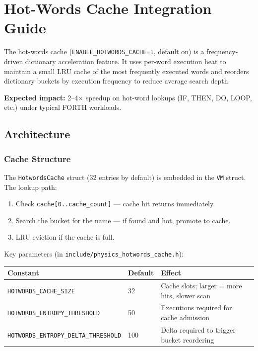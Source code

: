 
\section{Hot-Words Cache Integration Guide}

The hot-words cache (\texttt{ENABLE\_HOTWORDS\_CACHE=1}, default on) is a
frequency-driven dictionary acceleration feature. It uses per-word execution
heat to maintain a small LRU cache of the most frequently executed words and
reorders dictionary buckets by execution frequency to reduce average search
depth.

\textbf{Expected impact:} 2--4$\times$ speedup on hot-word lookups (IF, THEN,
DO, LOOP, etc.) under typical FORTH workloads.

\subsection{Architecture}

\subsubsection{Cache Structure}

The \texttt{HotwordsCache} struct (32 entries by default) is embedded in the
\texttt{VM} struct. The lookup path:

\begin{enumerate}
  \item Check \texttt{cache[0..cache\_count]} — cache hit returns immediately.
  \item Search the bucket for the name — if found and hot, promote to cache.
  \item LRU eviction if the cache is full.
\end{enumerate}

Key parameters (in \texttt{include/physics\_hotwords\_cache.h}):

\begin{center}
\begin{tabular}{lll}
\toprule
Constant & Default & Effect \\
\midrule
\texttt{HOTWORDS\_CACHE\_SIZE}                 & 32  & Cache slots; larger = more hits, slower scan \\
\texttt{HOTWORDS\_ENTROPY\_THRESHOLD}          & 50  & Executions required for cache admission \\
\texttt{HOTWORDS\_ENTROPY\_DELTA\_THRESHOLD}   & 100 & Delta required to trigger bucket reordering \\
\bottomrule
\end{tabular}
\end{center}

